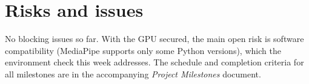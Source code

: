 \documentclass[11pt,a4paper]{article}
\begin{document}
\section{Risks and issues}
No blocking issues so far. With the GPU secured, the main open risk is
software compatibility (MediaPipe supports only some Python versions), which
the environment check this week addresses. The schedule and completion
criteria for all milestones are in the accompanying \emph{Project Milestones}
document.
\end{document}
